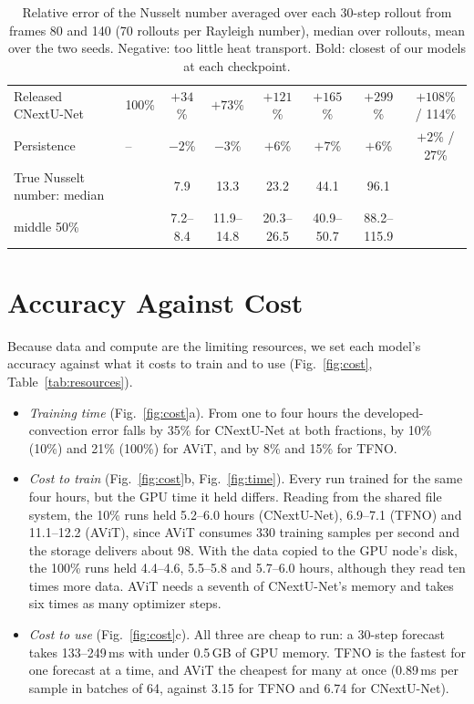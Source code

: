 \documentclass[11pt]{article}
\begin{document}
\begin{table}[!htbp]
\begin{tabular}{@{}llcccccc@{}}
\midrule
Released CNextU-Net & 100\% & $+34$\% & $+73$\% & $+121$\% & $+165$\% & $+299$\% & $+108$\% / 114\% \\
Persistence & -- & $-2$\% & $-3$\% & $+6$\% & $+7$\% & $+6$\% & $+2$\% / 27\% \\
\midrule
True Nusselt number: median & & 7.9 & 13.3 & 23.2 & 44.1 & 96.1 & \\
\quad middle 50\% & & 7.2--8.4 & 11.9--14.8 & 20.3--26.5 & 40.9--50.7 & 88.2--115.9 & \\
\bottomrule
\end{tabular}
\caption{Relative error of the Nusselt number averaged over each 30-step rollout from frames 80 and 140 (70 rollouts
per Rayleigh number), median over rollouts, mean over the two seeds. Negative: too little heat transport. Bold: closest
of our models at each checkpoint.}
\label{tab:nusselt}
\end{table}

\section{Accuracy Against Cost}
\label{sec:cost}

Because data and compute are the limiting resources, we set each model's accuracy against what it costs to train and
to use (Fig.~\ref{fig:cost}, Table~\ref{tab:resources}).
\begin{itemize}
    \item \emph{Training time} (Fig.~\ref{fig:cost}a). From one to four hours the developed-convection error falls
    by 35\% for CNextU-Net at both fractions, by 10\% (10\%) and 21\% (100\%) for AViT, and by 8\% and 15\% for TFNO.
    \item \emph{Cost to train} (Fig.~\ref{fig:cost}b, Fig.~\ref{fig:time}). Every run trained for the same four
    hours, but the GPU time it held differs. Reading from the shared file system, the 10\% runs held 5.2--6.0 hours
    (CNextU-Net), 6.9--7.1 (TFNO) and 11.1--12.2 (AViT), since AViT consumes 330 training samples per second and the
    storage delivers about 98. With the data copied to the GPU node's disk, the 100\% runs held 4.4--4.6, 5.5--5.8 and
    5.7--6.0 hours, although they read ten times more data. AViT needs a seventh of CNextU-Net's memory and takes six
    times as many optimizer steps.
    \item \emph{Cost to use} (Fig.~\ref{fig:cost}c). All three are cheap to run: a 30-step forecast takes
    133--249\,ms with under 0.5\,GB of GPU memory. TFNO is the fastest for one forecast at a time, and AViT the
    cheapest for many at once (0.89\,ms per sample in batches of 64, against 3.15 for TFNO and 6.74 for CNextU-Net).
\end{itemize}
\end{document}
